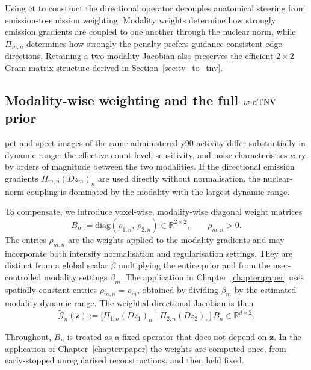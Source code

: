 Using \gls{ct} to construct the directional operator  decouples anatomical steering from emission-to-emission weighting. Modality weights determine how strongly emission gradients are coupled to one another through the nuclear norm, while $\Pi_{m,n}$ determines how strongly the penalty prefers guidance-consistent edge directions. Retaining a two-modality Jacobian also preserves the efficient $2\times2$ Gram-matrix structure derived in Section~\ref{sec:tv_to_tnv}.

\subsection{Modality-wise weighting and the full \texorpdfstring{$w\text{-}\mathrm{dTNV}$}{w-dTNV} prior}
\label{subsec:modality_weighting}

\gls{pet} and \gls{spect} images of the same administered \gls{y90} activity differ substantially in dynamic range: the effective count level, sensitivity, and noise characteristics vary by orders of magnitude between the two modalities. If the directional emission gradients $\Pi_{m,n}(D z_m)_n$ are used directly without normalisation, the nuclear-norm coupling is dominated by the modality with the largest dynamic range.

To compensate, we introduce voxel-wise, modality-wise diagonal weight matrices
\begin{equation}
    B_n := \mathrm{diag}(\rho_{1,n},\,\rho_{2,n}) \in \mathbb{R}^{2\times 2},
    \qquad \rho_{m,n} > 0.
    \label{eq:Bn_def}
\end{equation}
The entries $\rho_{m,n}$ are the weights applied to the modality gradients and may incorporate both intensity normalisation and regularisation settings. They are distinct from a global scalar $\beta$ multiplying the entire prior and from the user-controlled modality settings $\beta_m$. The application in Chapter~\ref{chapter:paper} uses spatially constant entries $\rho_{m,n}=\rho_m$, obtained by dividing $\beta_m$ by the estimated modality dynamic range.
The weighted directional Jacobian is then
\begin{equation}
    \tilde{\mathcal{G}}_n(\bm{z}) := \bigl[\Pi_{1,n}(D z_1)_n \;\big|\; \Pi_{2,n}(D z_2)_n\bigr]\,B_n
    \in \mathbb{R}^{d\times 2}.
    \label{eq:Yn_weighted}
\end{equation}

Throughout, $B_n$ is treated as a fixed operator that does not depend on $\bm{z}$. In the application of Chapter~\ref{chapter:paper} the weights are computed once, from early-stopped unregularised reconstructions, and then held fixed.

